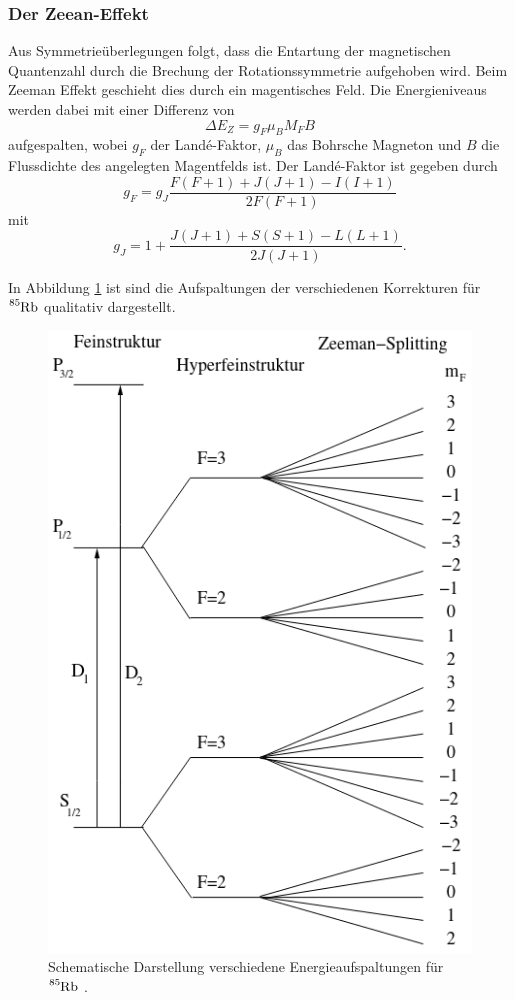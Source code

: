 \subsubsection{Der Zeean-Effekt}
Aus Symmetrieüberlegungen folgt, dass die Entartung der magnetischen 
Quantenzahl durch die Brechung der Rotationssymmetrie aufgehoben wird.
Beim Zeeman Effekt geschieht dies durch ein magentisches Feld. 
Die Energieniveaus werden dabei mit einer Differenz von 
\begin{equation}
    \Delta E_Z=g_F\mu_B M_F B
\end{equation}
aufgespalten, wobei $g_F$ der Landé-Faktor, $\mu_B$ das Bohrsche Magneton
und $B$ die Flussdichte des angelegten Magentfelds ist. Der Landé-Faktor
ist gegeben durch 
\begin{equation*}
    g_F=g_J\frac{F(F+1)+J(J+1)-I(I+1)}{2F(F+1)}
\end{equation*}
mit 
\begin{equation*}
    g_J=1+\frac{J(J+1)+S(S+1)-L(L+1)}{2J(J+1)}.
\end{equation*}

In Abbildung \ref{fig:niveaus} ist sind die Aufspaltungen der verschiedenen
Korrekturen für $\ce{^{85}Rb}$ qualitativ dargestellt.
\begin{figure}[H]
    \centering
    \includegraphics[scale= 0.4]{pictures/Niveaus.png}
    \caption{Schematische Darstellung verschiedene Energieaufspaltungen für $\ce{^{85}Rb}$ \cite{OptischesPumpen}.}
    \label{fig:niveaus}
\end{figure}


